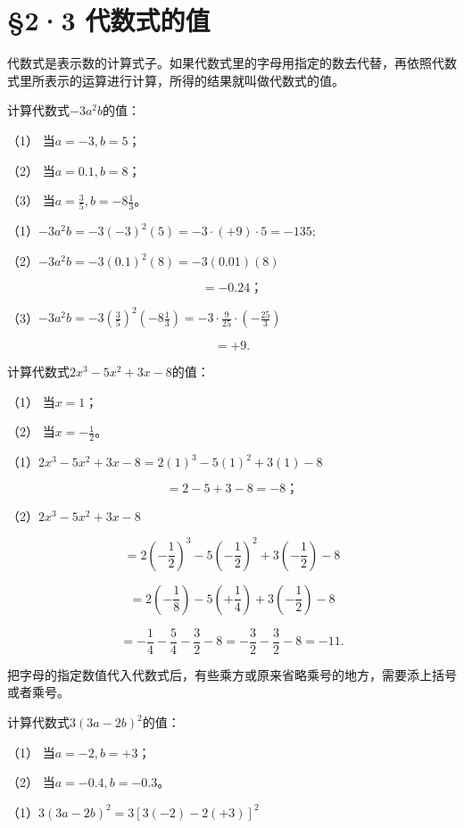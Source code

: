 \section{§2·3 代数式的值}

代数式是表示数的计算式子。如果代数式里的字母用指定的数去代替，再依照代数式里所表示的运算进行计算，所得的结果就叫做代数式的值。

 计算代数式\(-3a^{2}b\)的值：

（1） 当\(a = -3, b = 5\)；

（2） 当\(a = 0.1, b = 8\)；

（3） 当\(a = \frac{3}{5}, b = -8\frac{1}{3}\)。

（1）\(-3a^{2}b = -3(-3)^{2}(5) = -3\cdot (+9)\cdot 5 = -135;\)

（2）\(-3a^{2}b = -3(0.1)^{2}(8) = -3(0.01)(8)\)

\[
= - 0.24\text{；}
\]

（3）\(-3a^{2}b = -3\left(\frac{3}{5}\right)^{2}\left(-8\frac{1}{3}\right) = -3\cdot \frac{9}{25}\cdot \left(-\frac{25}{3}\right)\)

\[
= + 9.
\]

 计算代数式\(2x^{3} - 5x^{2} + 3x - 8\)的值：

（1） 当\(x = 1\)；

（2） 当\(x = -\frac{1}{2}\)。

（1）\(2x^{3} - 5x^{2} + 3x - 8 = 2(1)^{3} - 5(1)^{2} + 3(1) - 8\)

\[
= 2 - 5 + 3 - 8 = - 8\text{；}
\]

（2）\(2x^{3} - 5x^{2} + 3x - 8\)

\[
= 2 \left(- \frac{1}{2}\right) ^{3} - 5 \left(- \frac{1}{2}\right) ^{2} + 3 \left(- \frac{1}{2}\right) - 8
\]

\[
= 2 \left(- \frac{1}{8}\right) - 5 \left(+ \frac{1}{4}\right) + 3 \left(- \frac{1}{2}\right) - 8
\]

\[
= - \frac{1}{4} - \frac{5}{4} - \frac{3}{2} - 8 = - \frac{3}{2} - \frac{3}{2} - 8 = - 11.
\]

把字母的指定数值代入代数式后，有些乘方或原来省略乘号的地方，需要添上括号或者乘号。

 计算代数式\(3(3a-2b)^{2}\)的值：

（1） 当\(a = -2, b = +3\)；

（2） 当\(a = -0.4, b = -0.3\)。

 （1）\(3(3a - 2b)^{2} = 3[3(-2) - 2(+3)]^{2}\)

